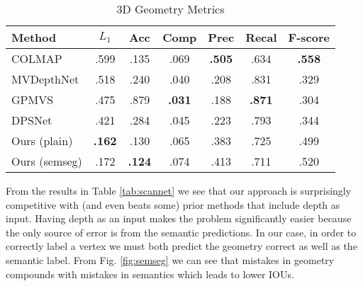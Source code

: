 \documentclass[runningheads]{llncs}
\begin{document}
 
\begin{table}[]
\centering
\caption{3D Geometry Metrics
}
\begin{tabular}{lcccccc}
\hline
Method & $L_1$ & Acc & Comp & Prec & Recal & F-score \\
\hline
COLMAP \cite{schoenberger2016mvs}    & .599 & .135 & .069 & \textbf{.505} & .634 & \textbf{.558} \\
MVDepthNet \cite{wang2018mvdepthnet} & .518 & .240 & .040 & .208 & .831 & .329 \\
GPMVS \cite{hou2019multi}            & .475 & .879 & \textbf{.031} & .188 & \textbf{.871} & .304 \\
DPSNet \cite{im2019dpsnet}           & .421 & .284 & .045 & .223 & .793 & .344 \\
\midrule
Ours (plain)                         & \textbf{.162} & .130 & .065 & .383 & .725 & .499 \\
Ours (semseg)                        & .172 & \textbf{.124} & .074 & .413 & .711 & .520 \\
\hline
\end{tabular}
\label{tab:results_geo}
\end{table}



From the results in Table \ref{tab:scannet} we see that our approach is surprisingly competitive with (and even beats some) prior methods that include depth as input. Having depth as an input makes the problem significantly easier because the only source of error is from the semantic predictions. In our case, in order to correctly label a vertex we must both predict the geometry correct as well as the semantic label. From Fig. \ref{fig:semseg} we can see that mistakes in geometry compounds with mistakes in semantics which leads to lower IOUs.
\end{document}
